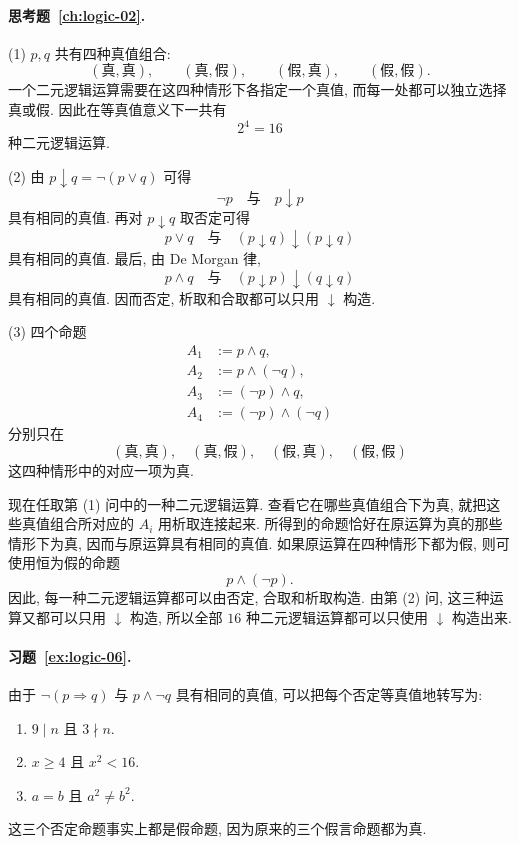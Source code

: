 \documentclass[usesamecnt, thmcnt=section, lang=cn, newtx, 10pt, scheme=chinese]{elegantbook}
\begin{document}
\paragraph*{思考题~\ref{ch:logic-02}.}
(1) $p,q$ 共有四种真值组合:
\[
(\text{真},\text{真}),\qquad
(\text{真},\text{假}),\qquad
(\text{假},\text{真}),\qquad
(\text{假},\text{假}).
\]
一个二元逻辑运算需要在这四种情形下各指定一个真值, 而每一处都可以独立选择真或假. 因此在等真值意义下一共有
\[
2^4=16
\]
种二元逻辑运算.

(2) 由 $p\downarrow q=\neg(p\vee q)$ 可得
\[
\neg p
\quad\text{与}\quad
p\downarrow p
\]
具有相同的真值. 再对 $p\downarrow q$ 取否定可得
\[
p\vee q
\quad\text{与}\quad
(p\downarrow q)\downarrow(p\downarrow q)
\]
具有相同的真值. 最后, 由 De Morgan 律,
\[
p\wedge q
\quad\text{与}\quad
(p\downarrow p)\downarrow(q\downarrow q)
\]
具有相同的真值. 因而否定, 析取和合取都可以只用 $\downarrow$ 构造.

(3) 四个命题
\[
\begin{aligned}
A_1&:=p\wedge q,\\
A_2&:=p\wedge(\neg q),\\
A_3&:=(\neg p)\wedge q,\\
A_4&:=(\neg p)\wedge(\neg q)
\end{aligned}
\]
分别只在
\[
(\text{真},\text{真}),\quad
(\text{真},\text{假}),\quad
(\text{假},\text{真}),\quad
(\text{假},\text{假})
\]
这四种情形中的对应一项为真.

现在任取第 (1) 问中的一种二元逻辑运算. 查看它在哪些真值组合下为真, 就把这些真值组合所对应的 $A_i$ 用析取连接起来. 所得到的命题恰好在原运算为真的那些情形下为真, 因而与原运算具有相同的真值. 如果原运算在四种情形下都为假, 则可使用恒为假的命题
\[
p\wedge(\neg p).
\]
因此, 每一种二元逻辑运算都可以由否定, 合取和析取构造. 由第 (2) 问, 这三种运算又都可以只用 $\downarrow$ 构造, 所以全部 $16$ 种二元逻辑运算都可以只使用 $\downarrow$ 构造出来.

\paragraph*{习题~\ref{ex:logic-06}.}
由于 $\neg(p\Rightarrow q)$ 与 $p\wedge\neg q$ 具有相同的真值, 可以把每个否定等真值地转写为:
\begin{enumerate}[label=\rm(\arabic*)]
  \item $9\mid n$ 且 $3\nmid n$.
  \item $x\geq4$ 且 $x^2<16$.
  \item $a=b$ 且 $a^2\neq b^2$.
\end{enumerate}
这三个否定命题事实上都是假命题, 因为原来的三个假言命题都为真.
\end{document}

